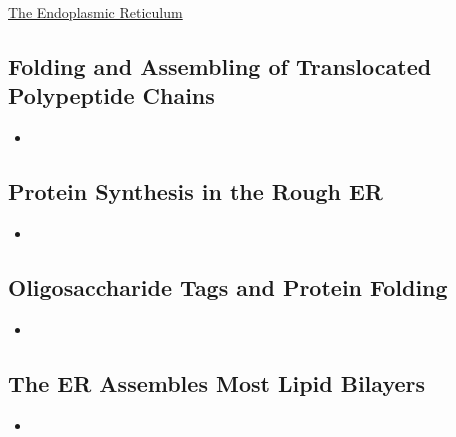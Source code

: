\documentclass[12pt,letterpaper]{article}
\begin{document}
\begin{secbox}{\hyperlink{12}{The Endoplasmic Reticulum}}
{    \hypertarget{12.5.7}{\subsection*{Folding and Assembling of Translocated Polypeptide Chains}}
    \begin{itemize}
        \item
    \end{itemize}
    
    \hypertarget{12.5.8}{\subsection*{Protein Synthesis in the Rough ER}}
    \begin{itemize}
        \item
    \end{itemize}
    
    \hypertarget{12.5.9}{\subsection*{Oligosaccharide Tags and Protein Folding}}
    \begin{itemize}
        \item
    \end{itemize}
    
    \hypertarget{12.5.10}{\subsection*{The ER Assembles Most Lipid Bilayers}}
    \begin{itemize}
        \item
    \end{itemize}
    
}
\end{secbox}
\end{document}
